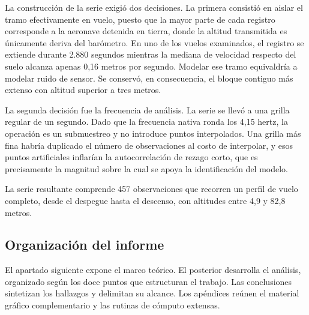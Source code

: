 La construcción de la serie exigió dos decisiones. La primera consistió en aislar el tramo
efectivamente en vuelo, puesto que la mayor parte de cada registro corresponde a la aeronave
detenida en tierra, donde la altitud transmitida es únicamente deriva del barómetro. En uno de
los vuelos examinados, el registro se extiende durante 2.880 segundos mientras la mediana de
velocidad respecto del suelo alcanza apenas 0,16 metros por segundo. Modelar ese tramo
equivaldría a modelar ruido de sensor. Se conservó, en consecuencia, el bloque contiguo más
extenso con altitud superior a tres metros.

La segunda decisión fue la frecuencia de análisis. La serie se llevó a una grilla regular de
un segundo. Dado que la frecuencia nativa ronda los 4,15 hertz, la operación es un submuestreo y no introduce puntos interpolados. Una grilla más fina habría duplicado el número
de observaciones al costo de interpolar, y esos puntos artificiales inflarían la
autocorrelación de rezago corto, que es precisamente la magnitud sobre la cual se apoya la
identificación del modelo.

La serie resultante comprende 457 observaciones que recorren un perfil de vuelo completo,
desde el despegue hasta el descenso, con altitudes entre 4,9 y 82,8 metros.

\subsection{Organización del informe}

El apartado siguiente expone el marco teórico. El posterior desarrolla el análisis, organizado
según los doce puntos que estructuran el trabajo. Las conclusiones sintetizan los hallazgos y
delimitan su alcance. Los apéndices reúnen el material gráfico complementario y las rutinas de
cómputo extensas.
